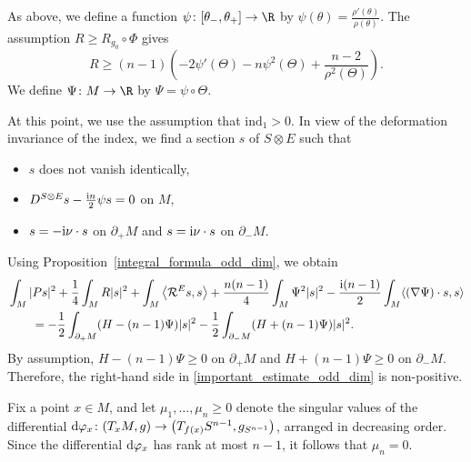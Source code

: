 As above, we define a function $\psi\colon [\theta_-,\theta_+] \to \R$ by $\psi(\theta) = \frac{\rho'(\theta)}{\rho(\theta)}$. The assumption $R \geq R_{g_0} \circ \Phi$ gives
\begin{equation} \label{ineq_for_scal_odd_dim}
R \geq (n-1) \left( -2 \psi'(\Theta) - n \psi^2(\Theta) + \frac{n-2}{\rho^2(\Theta)} \right).
\end{equation}
We define $\Psi\colon M \to \R$ by $\Psi = \psi \circ \Theta$.

At this point, we use the assumption that $\mathrm{ind}_1 > 0$. In view of the deformation invariance of the index, we find a section $s$ of $S \otimes E$ such that
\begin{itemize}\itemsep=0pt
 \item $s$ does not vanish identically,
 \item $D^{S \otimes E } s - \frac{{\rm i}n}{2} \psi s = 0$ on $M$,
 \item $s = -{\rm i} \nu \cdot s$ on $\partial_+ M$ and $s = {\rm i} \nu \cdot s$ on $\partial_- M$.
\end{itemize}
Using Proposition~\ref{integral_formula_odd_dim}, we obtain
\begin{align}
&\int_M |P s|^2 + \frac{1}{4} \int_M R |s|^2
+ \int_M \big\langle \mathcal{R}^E s,s \big\rangle + \frac{n(n-1)}{4} \int_M \Psi^2 |s|^2 - \frac{{\rm i}(n-1)}{2} \int_M \langle (\nabla \Psi) \cdot s,s \rangle\nonumber \\
&\qquad= -\frac{1}{2} \int_{\partial_+ M} (H-(n-1)\Psi) |s|^2 - \frac{1}{2} \int_{\partial_- M} (H+(n-1)\Psi) |s|^2. \label{important_estimate_odd_dim}
\end{align}
By assumption, $H-(n-1)\Psi \geq 0$ on $\partial_+ M$ and $H +(n-1)\Psi \geq 0$ on $\partial_- M$. Therefore, the right-hand side in \eqref{important_estimate_odd_dim} is non-positive.

Fix a point $x \in M $, and let $ \mu_1,\hdots,\mu_n \geq 0$ denote the singular values of the differential ${\rm d}\varphi_x\colon (T_x M,g ) \to \big(T_{f(x)} S^{n-1} ,g_{S^{n-1}}\big)$, arranged in decreasing order. Since the differential ${\rm d}\varphi_x$ has rank at most $n-1$, it follows that $\mu_n = 0$.


